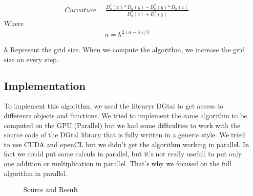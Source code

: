  \begin{align*}
	Curvature =  \frac{ D_{n}^2(x) * D_{n}(y)  -  D_{n}^2(y) * D_{n}(x) }{D_{n}^2(x) + D_{n}^2(y)}
 \end{align*}
Where
  \begin{align*}
	n = h^{2(\alpha - 3)/3}
  \end{align*}

$ h $ Represent the grid size. When we compute the algorithm, we increase the grid size on every step.

\subsection{Implementation}\FloatBarrier
To implement this algorithm, we used the libraryr DGtal to get access to differents objects and functions. We tried to implement the same algorithm to be computed on the GPU (Parallel) but we had some difficulties to work with the source code of the DGtal library that is fully written in a generic style. We tried to use CUDA and openCL but we didn't get the algorithm working in parallel. In fact we could put some calculs in parallel, but it's not really usefull to put only one addition or multiplication in parallel. That's why we focused on the full algorithm in parallel.

\begin{figure}[h]
    \centering
    \qquad
    \caption{Source and Result}
    \label{fig:example}
\end{figure}

